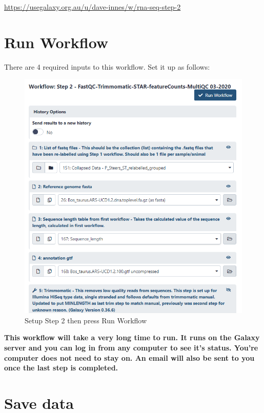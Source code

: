 \documentclass[
]{book}
\begin{document}
\url{https://usegalaxy.org.au/u/dave-innes/w/rna-seq-step-2}

\hypertarget{run-workflow-1}{%
\section{Run Workflow}\label{run-workflow-1}}

There are 4 required inputs to this workflow. Set it up as follows:

\begin{figure}

{\centering \includegraphics[width=1\linewidth]{images/image_step2} 

}

\caption{Setup Step 2 then press Run Workflow}\label{fig:run-workflow-step2}
\end{figure}

\textbf{This workflow will take a very long time to run. It runs on the Galaxy server and you can log in from any computer to see it's status. You're computer does not need to stay on. An email will also be sent to you once the last step is completed.}

\hypertarget{save-data}{%
\section{Save data}\label{save-data}}
\end{document}
